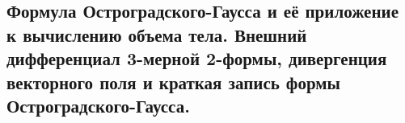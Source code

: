 \subsection{Формула Остроградского-Гаусса и её приложение к вычислению объема тела. Внешний дифференциал 3-мерной 2-формы, дивергенция векторного поля и краткая запись формы Остроградского-Гаусса.}